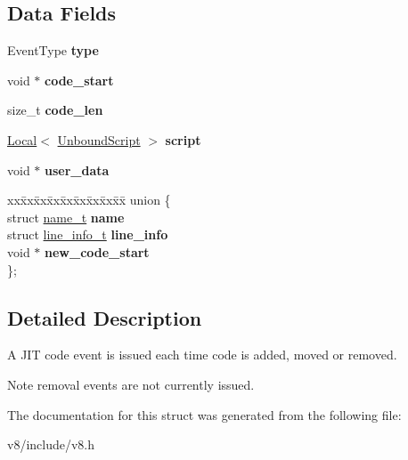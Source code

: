 \subsection*{Data Fields}
\begin{DoxyCompactItemize}
\item 
Event\+Type {\bfseries type}\hypertarget{structv8_1_1JitCodeEvent_ace1fbc4119ac3ef609d8e0f89cbc2c9f}{}\label{structv8_1_1JitCodeEvent_ace1fbc4119ac3ef609d8e0f89cbc2c9f}

\item 
void $\ast$ {\bfseries code\+\_\+start}\hypertarget{structv8_1_1JitCodeEvent_aeeac614e6c125bf08bf785b070090d0f}{}\label{structv8_1_1JitCodeEvent_aeeac614e6c125bf08bf785b070090d0f}

\item 
size\+\_\+t {\bfseries code\+\_\+len}\hypertarget{structv8_1_1JitCodeEvent_ad56f78749d03f5db29ed417c2f3b4666}{}\label{structv8_1_1JitCodeEvent_ad56f78749d03f5db29ed417c2f3b4666}

\item 
\hyperlink{classv8_1_1Local}{Local}$<$ \hyperlink{classv8_1_1UnboundScript}{Unbound\+Script} $>$ {\bfseries script}\hypertarget{structv8_1_1JitCodeEvent_a50ac4979f3d15900647b6b29dae3db76}{}\label{structv8_1_1JitCodeEvent_a50ac4979f3d15900647b6b29dae3db76}

\item 
void $\ast$ {\bfseries user\+\_\+data}\hypertarget{structv8_1_1JitCodeEvent_a90597e06440ebd68fe582bd1361d6de6}{}\label{structv8_1_1JitCodeEvent_a90597e06440ebd68fe582bd1361d6de6}

\item 
\begin{tabbing}
xx\=xx\=xx\=xx\=xx\=xx\=xx\=xx\=xx\=\kill
union \{\\
\>struct \hyperlink{structv8_1_1JitCodeEvent_1_1name__t}{name\_t} {\bfseries name}\\
\>struct \hyperlink{structv8_1_1JitCodeEvent_1_1line__info__t}{line\_info\_t} {\bfseries line\_info}\\
\>void $\ast$ {\bfseries new\_code\_start}\\
\}; \hypertarget{structv8_1_1JitCodeEvent_a4c66ebaa0d14b47a28601446150ae617}{}\label{structv8_1_1JitCodeEvent_a4c66ebaa0d14b47a28601446150ae617}
\\

\end{tabbing}\end{DoxyCompactItemize}


\subsection{Detailed Description}
A J\+IT code event is issued each time code is added, moved or removed.

\begin{DoxyNote}{Note}
removal events are not currently issued. 
\end{DoxyNote}


The documentation for this struct was generated from the following file\+:\begin{DoxyCompactItemize}
\item 
v8/include/v8.\+h\end{DoxyCompactItemize}
